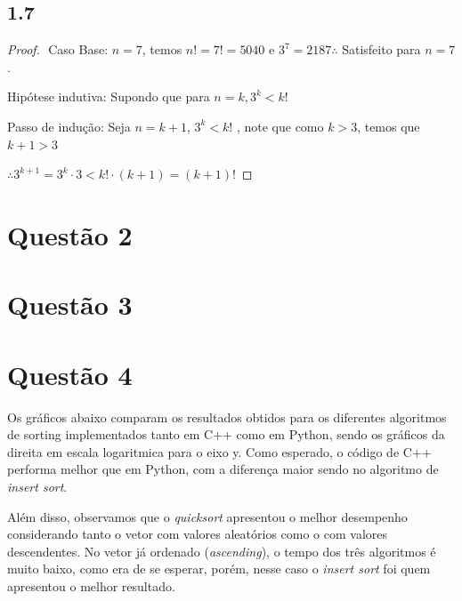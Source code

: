 \documentclass{article}
\begin{document}
\subsection*{1.7}
\begin{proof}
$ $\newline
Caso Base: $n = 7$, temos $n! = 7! = 5040$ e $3^7 = 2187 \therefore$ Satisfeito para $n = 7$.

Hipótese indutiva: Supondo que para $n=k, 3^k < k!$

Passo de indução: Seja $n = k + 1$, $3^k < k!$
, note que como $k>3$, temos que $k+1>3$

$\therefore 3^{k+1}=3^k\cdot3 < k!\cdot(k+1)=(k+1)!$

\end{proof}


\section*{Questão 2}
\section*{Questão 3}
\section*{Questão 4}

Os gráficos abaixo comparam os resultados obtidos para os diferentes algoritmos de sorting
implementados tanto em C++ como em Python, sendo os gráficos da direita em escala logaritmica para o eixo y.
Como esperado, o código de C++ performa melhor
que em Python, com a diferença maior sendo no algoritmo de {\it insert sort}.

Além disso, observamos que o {\it quicksort} apresentou o melhor
desempenho considerando tanto o vetor com valores aleatórios como o com
valores descendentes.
No vetor já ordenado ({\it ascending}), o tempo dos três algoritmos é muito baixo, como
era de se esperar, porém, nesse caso o {\it insert sort} foi quem apresentou o melhor
resultado.
\end{document}
